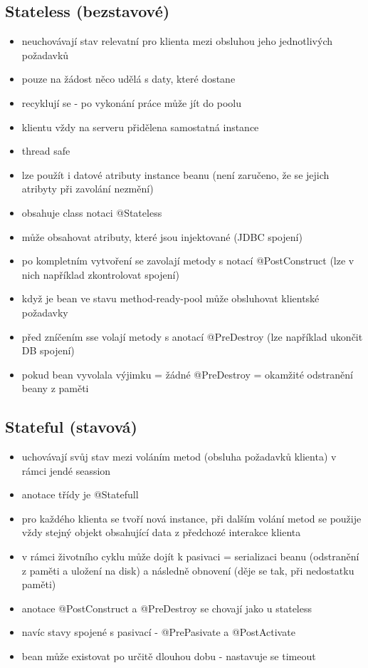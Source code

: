 \documentclass{szzclass}
\begin{document}
\subsection{Stateless (bezstavové)}
\begin{itemize}
    \item neuchovávají stav relevatní pro klienta mezi obsluhou jeho jednotlivých požadavků
    \item pouze na žádost něco udělá s daty, které dostane
    \item recyklují se - po vykonání práce může jít do poolu
    \item klientu vždy na serveru přidělena samostatná instance
    \item thread safe
    \item lze použít i datové atributy instance beanu (není zaručeno, že se jejich atribyty při zavolání nezmění)
    \item obsahuje class notaci @Stateless
    \item může obsahovat atributy, které jsou injektované (JDBC spojení)
    \item po kompletním vytvoření se zavolají metody s notací @PostConstruct (lze v nich například zkontrolovat spojení)
    \item když je bean ve stavu method-ready-pool může obsluhovat klientské požadavky
    \item před zníčením sse volají metody s anotací @PreDestroy (lze například ukončit DB spojení)
    \item pokud bean vyvolala výjimku = žádné @PreDestroy = okamžité odstranění beany z paměti
\end{itemize}
\subsection{Stateful (stavová)}
\begin{itemize}
    \item uchovávají svůj stav mezi voláním metod (obsluha požadavků klienta) v rámci jendé seassion
    \item anotace třídy je @Statefull
    \item pro každého klienta se tvoří nová instance, při dalším volání metod se použije vždy stejný objekt obsahující data z předchozé interakce klienta
    \item v rámci životního cyklu může dojít k pasivaci = serializaci beanu (odstranění z paměti a uložení na disk) a následně obnovení (děje se tak, při nedostatku paměti)
    \item anotace @PostConstruct a @PreDestroy se chovají jako u stateless
    \item navíc stavy spojené s pasivací - @PrePasivate a @PostActivate
    \item bean může existovat po určitě dlouhou dobu - nastavuje se timeout
\end{itemize}
\end{document}
